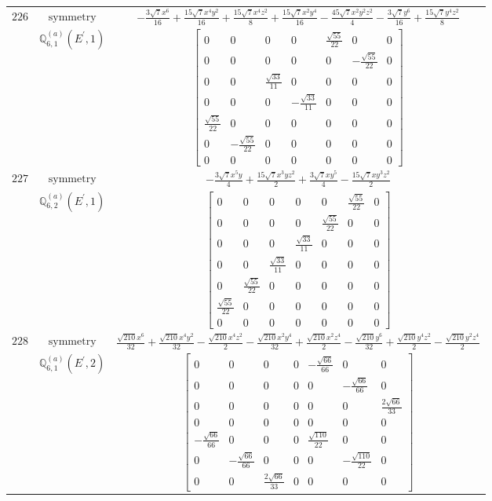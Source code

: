 \documentclass[fleqn,8pt,landscape]{jsarticle}
\begin{document}
\begin{longtable}{ccc}
$ 226 $ & $ \text{symmetry} $ & $ - \frac{3 \sqrt{7} x^{6}}{16} + \frac{15 \sqrt{7} x^{4} y^{2}}{16} + \frac{15 \sqrt{7} x^{4} z^{2}}{8} + \frac{15 \sqrt{7} x^{2} y^{4}}{16} - \frac{45 \sqrt{7} x^{2} y^{2} z^{2}}{4} - \frac{3 \sqrt{7} y^{6}}{16} + \frac{15 \sqrt{7} y^{4} z^{2}}{8} $ \\
$  $ & $ \mathbb{Q}_{6,1}^{(a)}(E^{\prime},1) $ & $ \begin{bmatrix} 0 & 0 & 0 & 0 & \frac{\sqrt{55}}{22} & 0 & 0 \\ 0 & 0 & 0 & 0 & 0 & - \frac{\sqrt{55}}{22} & 0 \\ 0 & 0 & \frac{\sqrt{33}}{11} & 0 & 0 & 0 & 0 \\ 0 & 0 & 0 & - \frac{\sqrt{33}}{11} & 0 & 0 & 0 \\ \frac{\sqrt{55}}{22} & 0 & 0 & 0 & 0 & 0 & 0 \\ 0 & - \frac{\sqrt{55}}{22} & 0 & 0 & 0 & 0 & 0 \\ 0 & 0 & 0 & 0 & 0 & 0 & 0 \end{bmatrix} $ \\ \hline
$ 227 $ & $ \text{symmetry} $ & $ - \frac{3 \sqrt{7} x^{5} y}{4} + \frac{15 \sqrt{7} x^{3} y z^{2}}{2} + \frac{3 \sqrt{7} x y^{5}}{4} - \frac{15 \sqrt{7} x y^{3} z^{2}}{2} $ \\
$  $ & $ \mathbb{Q}_{6,2}^{(a)}(E^{\prime},1) $ & $ \begin{bmatrix} 0 & 0 & 0 & 0 & 0 & \frac{\sqrt{55}}{22} & 0 \\ 0 & 0 & 0 & 0 & \frac{\sqrt{55}}{22} & 0 & 0 \\ 0 & 0 & 0 & \frac{\sqrt{33}}{11} & 0 & 0 & 0 \\ 0 & 0 & \frac{\sqrt{33}}{11} & 0 & 0 & 0 & 0 \\ 0 & \frac{\sqrt{55}}{22} & 0 & 0 & 0 & 0 & 0 \\ \frac{\sqrt{55}}{22} & 0 & 0 & 0 & 0 & 0 & 0 \\ 0 & 0 & 0 & 0 & 0 & 0 & 0 \end{bmatrix} $ \\ \hline
$ 228 $ & $ \text{symmetry} $ & $ \frac{\sqrt{210} x^{6}}{32} + \frac{\sqrt{210} x^{4} y^{2}}{32} - \frac{\sqrt{210} x^{4} z^{2}}{2} - \frac{\sqrt{210} x^{2} y^{4}}{32} + \frac{\sqrt{210} x^{2} z^{4}}{2} - \frac{\sqrt{210} y^{6}}{32} + \frac{\sqrt{210} y^{4} z^{2}}{2} - \frac{\sqrt{210} y^{2} z^{4}}{2} $ \\
$  $ & $ \mathbb{Q}_{6,1}^{(a)}(E^{\prime},2) $ & $ \begin{bmatrix} 0 & 0 & 0 & 0 & - \frac{\sqrt{66}}{66} & 0 & 0 \\ 0 & 0 & 0 & 0 & 0 & - \frac{\sqrt{66}}{66} & 0 \\ 0 & 0 & 0 & 0 & 0 & 0 & \frac{2 \sqrt{66}}{33} \\ 0 & 0 & 0 & 0 & 0 & 0 & 0 \\ - \frac{\sqrt{66}}{66} & 0 & 0 & 0 & \frac{\sqrt{110}}{22} & 0 & 0 \\ 0 & - \frac{\sqrt{66}}{66} & 0 & 0 & 0 & - \frac{\sqrt{110}}{22} & 0 \\ 0 & 0 & \frac{2 \sqrt{66}}{33} & 0 & 0 & 0 & 0 \end{bmatrix} $ \\ \hline

\end{longtable}
\end{document}
